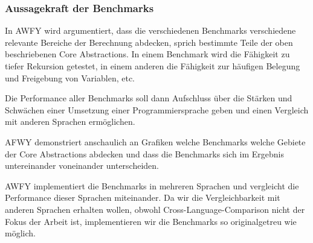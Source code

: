 \subsubsection{Aussagekraft der Benchmarks}
In AWFY wird argumentiert, dass die verschiedenen Benchmarks verschiedene relevante Bereiche der Berechnung abdecken, sprich bestimmte Teile der oben beschriebenen Core Abstractions.
In einem Benchmark wird die Fähigkeit zu tiefer Rekursion getestet, in einem anderen die Fähigkeit zur häufigen Belegung und Freigebung von Variablen, etc.

Die Performance aller Benchmarks soll dann Aufschluss über die Stärken und Schwächen einer Umsetzung einer Programmiersprache geben und einen Vergleich mit anderen Sprachen ermöglichen.

AFWY demonstriert anschaulich an Grafiken welche Benchmarks welche Gebiete der Core Abstractions abdecken und dass die Benchmarks sich im Ergebnis untereinander voneinander unterscheiden.

AWFY implementiert die Benchmarks in mehreren Sprachen und vergleicht die Performance dieser Sprachen miteinander. Da wir die Vergleichbarkeit mit anderen Sprachen erhalten wollen, obwohl Cross-Language-Comparison nicht der Fokus der Arbeit ist, implementieren wir die Benchmarks so originalgetreu wie möglich. 
